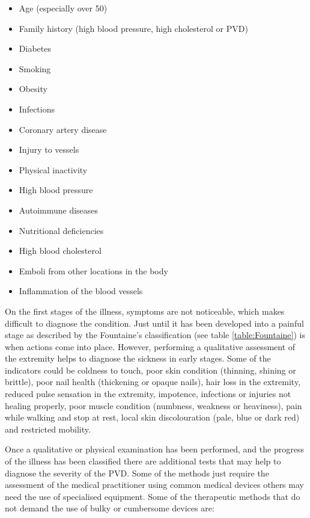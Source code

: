 \begin{itemize}[noitemsep]
    \item Age (especially over \num{50})
    \item Family history (high blood pressure, high cholesterol or PVD)
    \item Diabetes
    \item Smoking
    \item Obesity
    \item Infections
    \item Coronary artery disease
    \item Injury to vessels
    \item Physical inactivity
    \item High blood pressure
    \item Autoimmune diseases
    \item Nutritional deficiencies
    \item High blood cholesterol
    \item Emboli from other locations in the body
    \item Inflammation of the blood vessels
\end{itemize}

On the first stages of the illness, symptoms are not noticeable, which makes difficult to diagnose the condition. Just until it has been developed into a painful stage as described by the Fountaine's classification (see table \ref{table:Fountaine}) is when actions come into place. However, performing a qualitative assessment of the extremity helps to diagnose the sickness in early stages. Some of the indicators could be coldness to touch, poor skin condition (thinning, shining or brittle), poor nail health (thickening or opaque nails), hair loss in the extremity, reduced pulse sensation in the extremity, impotence, infections or injuries not healing properly, poor muscle condition (numbness, weakness or heaviness), pain while walking and stop at rest, local skin discolouration (pale, blue or dark red) and restricted mobility. 

Once a qualitative or physical examination has been performed, and the progress of the illness has been classified there are additional tests that may help to diagnose the severity of the PVD. Some of the methods just require the assessment of the medical practitioner using common medical devices others may need the use of specialised equipment. Some of the therapeutic methods that do not demand the use of bulky or cumbersome devices are:


